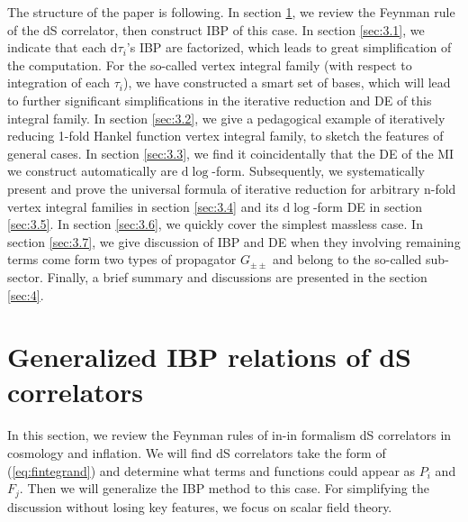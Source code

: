 \documentclass[a4paper,11pt]{article}
\newcommand{\nd}{\mathrm{d}}
\def\eqref#1{(\ref{#1})}
\begin{document}
The structure of the paper is following. In section \ref{sec:2}, we review the Feynman rule of the dS correlator, then construct IBP of this case. In section \ref{sec:3.1}, we indicate that  each $\nd \tau_i$'s IBP are factorized, which leads to great simplification of the computation. For the so-called vertex integral family (with respect to integration of each $\tau_i$), we have constructed a smart set of bases, which will lead to further significant simplifications in the iterative reduction and DE of this integral family. In section \ref{sec:3.2}, we give a pedagogical example of iteratively reducing 1-fold Hankel function vertex integral family, to sketch the features of general cases. In section \ref{sec:3.3}, we find it coincidentally that the DE of the MI we construct automatically are $\nd \log$-form.  Subsequently, we systematically present and prove the universal formula of iterative reduction for arbitrary n-fold vertex integral families in section \ref{sec:3.4} and its $\nd \log$-form DE in section \ref{sec:3.5}. In section \ref{sec:3.6}, we quickly cover the simplest massless case. In section \ref{sec:3.7}, we give discussion of IBP and DE when they involving remaining terms come form two types of propagator $G_{\pm\pm}$ and belong to the so-called sub-sector. Finally, a brief summary and discussions are presented in the section \ref{sec:4}.



\section{Generalized IBP relations of dS correlators} \label{sec:2}

In this section, we  review the Feynman rules of in-in formalism dS correlators in cosmology and inflation. We will find  dS correlators take the form of \eqref{eq:fintegrand} and determine what terms and functions could appear as $P_i$ and $F_j$. Then we will generalize the IBP method to this case. For simplifying the discussion without losing key features, we focus on scalar field theory.
\end{document}
